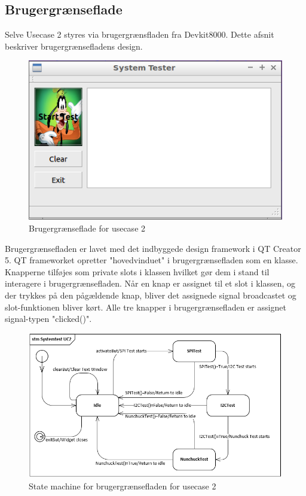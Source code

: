 \subsection{Brugergrænseflade}
Selve Usecase 2 styres via brugergrænsfladen fra Devkit8000.
Dette afsnit beskriver brugergrænsefladens design.

\begin{figure}[H]
	\centering
	\includegraphics[width=\textwidth]{Afsnit/DesignOgImplementering/images/GUIPic}
	\caption{Brugergrænseflade for usecase 2}
	\label{fig:GUIPic}
\end{figure}

Brugergrænsefladen er lavet med det indbyggede design framework i QT Creator 5.
QT frameworket opretter "hovedvinduet" i brugergrænsefladen som en klasse. Knapperne tilføjes som private slots i klassen
hvilket gør dem i stand til interagere i brugergrænsefladen. Når en knap er assignet til et slot i klassen, og der trykkes på den pågældende knap, bliver det assignede signal broadcastet
og slot-funktionen bliver kørt. Alle tre knapper i brugergrænsefladen er assignet signal-typen "clicked()".

\begin{figure}[H]
	\centering
	\includegraphics[width=1.2\textwidth]{Afsnit/DesignOgImplementering/images/StateMachineUC2}
	\caption{State machine for brugergrænsefladen for usecase 2}
	\label{fig:StateMachineUC2}
\end{figure}


